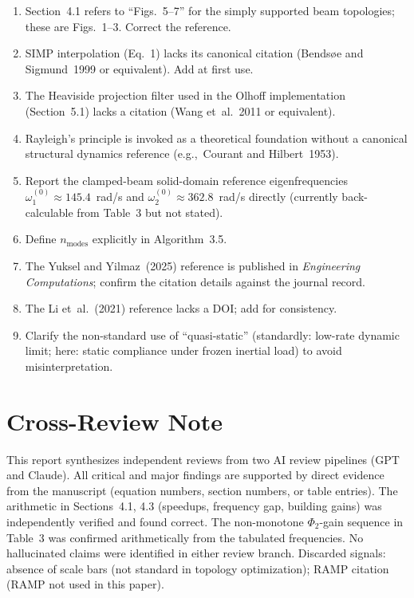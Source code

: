 \documentclass[11pt,a4paper]{article}
\begin{document}
\begin{enumerate}[label=\textbf{m\arabic*.},nosep]
  \item Section~4.1 refers to ``Figs.~5--7'' for the simply supported beam topologies;
    these are Figs.~1--3. Correct the reference.
  \item SIMP interpolation (Eq.~1) lacks its canonical citation
    (Bends{\o}e and Sigmund~1999 or equivalent). Add at first use.
  \item The Heaviside projection filter used in the Olhoff implementation
    (Section~5.1) lacks a citation (Wang et~al.~2011 or equivalent).
  \item Rayleigh's principle is invoked as a theoretical foundation without a canonical
    structural dynamics reference (e.g.,~Courant and Hilbert~1953).
  \item Report the clamped-beam solid-domain reference eigenfrequencies
    $\omega_1^{(0)}\approx145.4$~rad/s and $\omega_2^{(0)}\approx362.8$~rad/s directly
    (currently back-calculable from Table~3 but not stated).
  \item Define $n_\mathrm{modes}$ explicitly in Algorithm~3.5.
  \item The Yuksel and Yilmaz~(2025) reference is published in
    \textit{Engineering Computations}; confirm the citation details against the journal
    record.
  \item The Li et~al.~(2021) reference lacks a DOI; add for consistency.
  \item Clarify the non-standard use of ``quasi-static'' (standardly: low-rate dynamic
    limit; here: static compliance under frozen inertial load) to avoid
    misinterpretation.
\end{enumerate}


\section*{Cross-Review Note}

This report synthesizes independent reviews from two AI review pipelines (GPT and Claude).
All critical and major findings are supported by direct evidence from the manuscript
(equation numbers, section numbers, or table entries).
The arithmetic in Sections~4.1, 4.3 (speedups, frequency gap, building gains) was
independently verified and found correct. The non-monotone $\Phi_2$-gain sequence in
Table~3 was confirmed arithmetically from the tabulated frequencies.
No hallucinated claims were identified in either review branch.
Discarded signals: absence of scale bars (not standard in topology optimization); RAMP
citation (RAMP not used in this paper).
\end{document}
